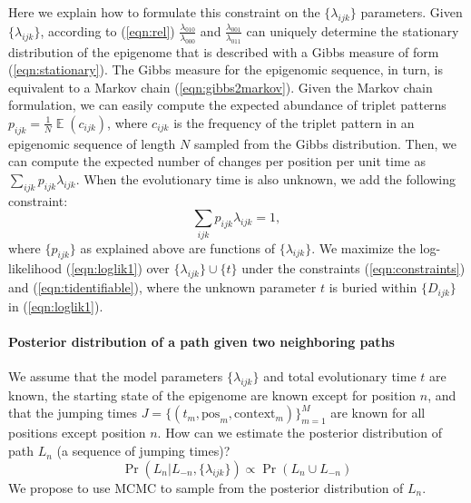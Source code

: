 \documentclass[11pt]{article}
\DeclareMathOperator{\E}{\mathbb{E}}
\begin{document}
Here we explain how to formulate this constraint on the
$\{\lambda_{ijk}\}$ parameters. Given $\{\lambda_{ijk}\}$, according
to (\ref{eqn:rel}) $\frac{\lambda_{010}}{\lambda_{000}}$ and
$\frac{\lambda_{001}}{\lambda_{011}}$ can uniquely determine the
stationary distribution of the epigenome that is described with a
Gibbs measure of form (\ref{eqn:stationary}).  The Gibbs measure for
the epigenomic sequence, in turn, is equivalent to a Markov chain
(\ref{eqn:gibbs2markov}). Given the Markov chain formulation, we can
easily compute the expected abundance of triplet patterns $p_{ijk} =
\frac{1}{N}\E(c_{ijk})$, where $c_{ijk}$ is the frequency of the
triplet pattern in an epigenomic sequence of length $N$ sampled from
the Gibbs distribution. Then, we can compute the expected number of
changes per position per unit time as
$\sum_{ijk}p_{ijk}\lambda_{ijk}$. When the evolutionary time is also
unknown, we add the following constraint:
\begin{equation}\label{eqn:tidentifiable}
\sum_{ijk}p_{ijk}\lambda_{ijk} = 1,
\end{equation}
where $\{p_{ijk}\}$ as explained above are functions of
$\{\lambda_{ijk}\}$.  We maximize the log-likelihood
(\ref{eqn:loglik1}) over $\{\lambda_{ijk}\}\cup\{t\}$ under the
constraints (\ref{eqn:constraints}) and (\ref{eqn:tidentifiable}),
where the unknown parameter $t$ is buried within $\{D_{ijk}\}$ in
(\ref{eqn:loglik1}).


\paragraph{Posterior distribution of a path given two neighboring paths} We
assume that the model parameters $\{\lambda_{ijk}\}$ and total
evolutionary time $t$ are known, the starting state of the epigenome
are known except for position $n$, and that the jumping times $J =
\{(t_m, \text{pos}_m, \text{context}_m) \}_{m=1}^{M}$ are known for
all positions except position $n$. How can we estimate the posterior
distribution of path $L_{n}$ (a sequence of jumping times)?
\[
\Pr(L_n|L_{-n}, \{\lambda_{ijk}\}) \propto \Pr(L_n\cup L_{-n})
\]
We propose to use MCMC to sample from the posterior
distribution of $L_n$.
\end{document}
